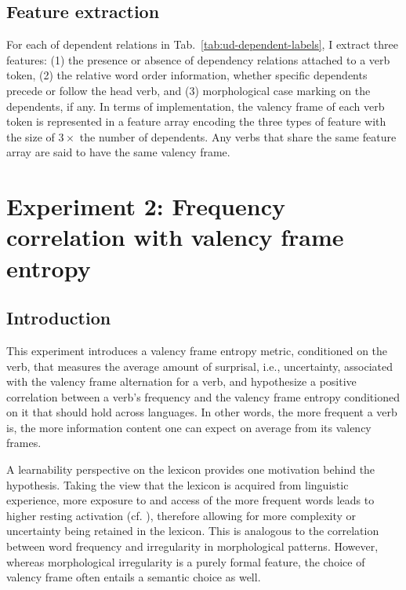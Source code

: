 \subsection{Feature extraction}

For each of dependent relations in Tab.~\ref{tab:ud-dependent-labels}, I extract three features: (1) the presence or absence of dependency relations attached to a verb token, (2) the relative word order information, whether specific dependents precede or follow the head verb, and (3) morphological case marking on the dependents, if any. In terms of implementation, the valency frame of each verb token is represented in a feature array encoding the three types of feature with the size of $3\times$ the number of dependents. Any verbs that share the same feature array are said to have the same valency frame.

\section{Experiment 2: Frequency correlation with valency frame entropy}\label{sec:exp2-valency-frame-entropy}

\subsection{Introduction}
This experiment introduces a valency frame entropy metric, conditioned on the verb, that measures the average amount of surprisal, i.e., uncertainty, associated with the valency frame alternation for a verb, and hypothesize a positive correlation between a verb's frequency and the valency frame entropy conditioned on it that should hold across languages. In other words, the more frequent a verb is, the more information content one can expect on average from its valency frames.

A learnability perspective on the lexicon provides one motivation behind the hypothesis. Taking the view that the lexicon is acquired from linguistic experience, more exposure to and access of the more frequent words leads to higher resting activation (cf. \citealp*{bybee1998}), therefore allowing for more complexity or uncertainty being retained in the lexicon. This is analogous to the correlation between word frequency and irregularity in morphological patterns. However, whereas morphological irregularity is a purely formal feature, the choice of valency frame often entails a semantic choice as well.

